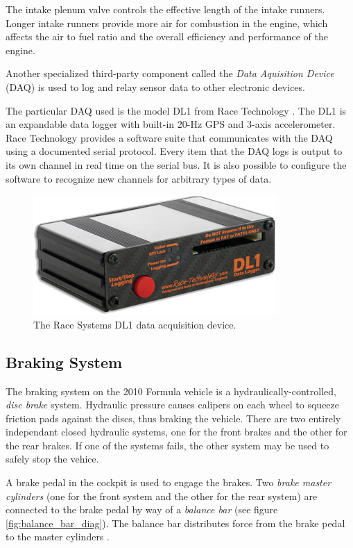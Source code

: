The intake plenum valve controls the effective length of the intake runners. Longer intake runners provide more air for combustion in the engine, which affects the air to fuel ratio and the overall efficiency and performance of the engine.

Another specialized third-party component called the \emph{Data Aquisition Device} (DAQ) is used to log and relay sensor data to other electronic devices.

The particular DAQ used is the model DL1 from Race Technology \cite{DL1Dsheet}. The DL1 is an expandable data logger with built-in 20-Hz GPS and 3-axis accelerometer. Race Technology provides a software suite that communicates with the DAQ using a documented serial protocol. Every item that the DAQ logs is output to its own channel in real time on the serial bus. It is also possible to configure the software to recognize new channels for arbitrary types of data. 

\begin{figure}[H]
	\centering
	 	\includegraphics[scale=0.5]{figures/dl1.png}
    \caption{The Race Systems DL1 data acquisition device.}
    \label{fig:dl1_product}
\end{figure}

\subsection{Braking System}

The braking system on the 2010 Formula vehicle is a hydraulically-controlled, \emph{disc brake} system. Hydraulic pressure causes calipers on each wheel to squeeze friction pads against the discs, thus braking the vehicle. There are two entirely independant closed hydraulic systems, one for the front brakes and the other for the rear brakes. If one of the systems fails, the other system may be used to safely stop the vehice.

A brake pedal in the cockpit is used to engage the brakes. Two \emph{brake master cylinders} (one for the front system and the other for the rear system) are connected to the brake pedal by way of a \emph{balance bar} (see figure \ref{fig:balance_bar_diag}). The balance bar distributes force from the brake pedal to the master cylinders \cite{TiltonBrakeBias}. 

